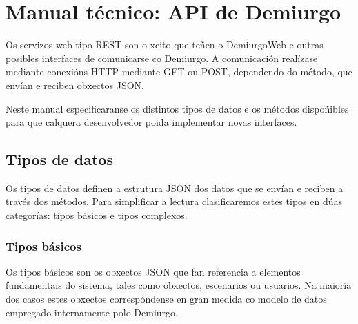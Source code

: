 \chapter{Manual técnico: API de Demiurgo}
\label{ch:api}
\renewcommand\theadfont{\bfseries}
\renewcommand\cellalign{ll}

Os servizos web tipo REST son o xeito que teñen o DemiurgoWeb e outras posibles
interfaces de comunicarse co Demiurgo. A comunicación realízase mediante
conexións HTTP mediante GET ou POST, dependendo do método, que envían e reciben
obxectos JSON.
\par
Neste manual especificaranse os distintos tipos de datos e os métodos
dispoñibles para que calquera desenvolvedor poida implementar novas interfaces.

\section{Tipos de datos}
Os tipos de datos definen a estrutura JSON dos datos que se envían e reciben a
través dos métodos. Para simplificar a lectura clasificaremos estes tipos en
dúas categorías: tipos básicos e tipos complexos.

\subsection{Tipos básicos}
Os tipos básicos son os obxectos JSON que fan referencia a elementos
fundamentais do sistema, tales como obxectos, escenarios ou usuarios. Na maioría
dos casos estes obxectos correspóndense en gran medida co modelo de datos
empregado internamente polo Demiurgo.

